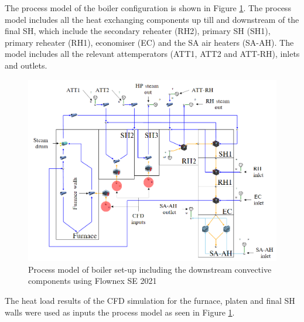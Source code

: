 \documentclass[review]{elsarticle}
\begin{document}
The process model of the boiler configuration is shown in Figure \ref{fig_flownex}. The process model includes all the heat exchanging components up till and downstream of the final SH, which include the secondary reheater (RH2), primary SH (SH1), primary reheater (RH1), economiser (EC) and the SA air heaters (SA-AH). The model includes all the relevant attemperators (ATT1, ATT2 and ATT-RH), inlets and outlets.
\begin{figure}[h!]
\centering
\includegraphics[scale=0.5]{FLOWNEX_SETUP}
\caption{Process model of boiler set-up including the downstream convective components using Flownex SE 2021}
\label{fig_flownex}
\end{figure}

The heat load results of the CFD simulation for the furnace, platen and final SH walls were used as inputs the process model as seen in Figure \ref{fig_flownex}. 
\newpage
\end{document}
